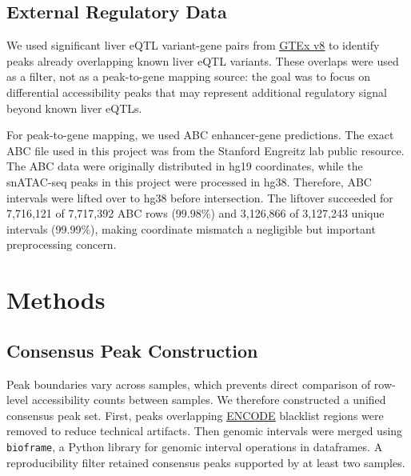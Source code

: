 \documentclass[11pt]{article}
\begin{document}
  \subsection{External Regulatory Data}\label{subsec:external-regulatory-data}
  We used significant liver eQTL variant-gene pairs from \href{https://storage.googleapis.com/adult-gtex/bulk-qtl/v8/single-tissue-cis-qtl/GTEx_Analysis_v8_eQTL.tar}{\underline{GTEx v8}} to identify peaks already overlapping known liver eQTL variants\cite{GTEx2020}.
  These overlaps were used as a filter, not as a peak-to-gene mapping source: the goal was to focus on differential accessibility peaks that may represent additional regulatory signal beyond known liver eQTLs.

  For peak-to-gene mapping, we used ABC enhancer-gene predictions\cite{Fulco2019ABC}.
  The exact ABC file used in this project was \href{https://mitra.stanford.edu/engreitz/oak/public/Nasser2021/AllPredictions.AvgHiC.ABC0.015.minus150.ForABCPaperV3.txt.gz}{} from the Stanford Engreitz lab public resource\cite{StanfordABCPredictions}.
  The ABC data were originally distributed in hg19 coordinates, while the snATAC-seq peaks in this project were processed in hg38.
  Therefore, ABC intervals were lifted over to hg38 before intersection.
  The liftover succeeded for 7,716,121 of 7,717,392 ABC rows (99.98\%) and 3,126,866 of 3,127,243 unique intervals (99.99\%), making coordinate mismatch a negligible but important preprocessing concern.

  \section{Methods}\label{sec:methods}

  \subsection{Consensus Peak Construction}\label{subsec:consensus-peak-construction}
  Peak boundaries vary across samples, which prevents direct comparison of row-level accessibility counts between samples.
  We therefore constructed a unified consensus peak set.
  First, peaks overlapping \href{https://www.encodeproject.org/files/ENCFF356LFX/@@download/ENCFF356LFX.bed.gz}{\underline{ENCODE}} blacklist regions were removed to reduce technical artifacts\cite{Amemiya2019Blacklist}.
  Then genomic intervals were merged using \texttt{bioframe}, a Python library for genomic interval operations in dataframes\cite{Open2C2024Bioframe}.
  A reproducibility filter retained consensus peaks supported by at least two samples.
\end{document}
